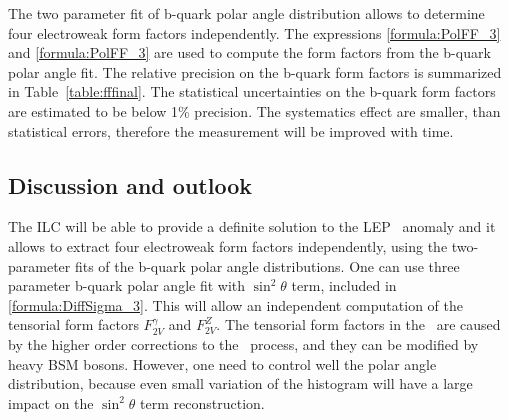 The two parameter fit of b-quark polar angle distribution allows to determine four electroweak form factors independently.
The expressions \ref{formula:PolFF_3} and \ref{formula:PolFF_3} are used to compute the form factors from the b-quark polar angle fit. 
The relative precision on the b-quark form factors is summarized in Table~\ref{table:fffinal}. 
The statistical uncertainties on the b-quark form factors are estimated to be below 1\% precision.
The systematics effect are smaller, than statistical errors, therefore the measurement will be improved with time. 






\subsection{Discussion and outlook}
The ILC will be able to provide a definite solution to the LEP \afbb\ anomaly and it allows to extract four electroweak form factors independently, using the two-parameter fits of the b-quark polar angle distributions. 
One can use three parameter b-quark polar angle fit with $\sin^2 \theta$ term, included in \ref{formula:DiffSigma_3}. 
This will allow an independent computation of the tensorial form factors $F^\gamma_{2V}$ and $F^Z_{2V}$.
The tensorial form factors in the \sm\ are caused by the higher order corrections to the \bbbar\ process, and they can be modified by heavy BSM bosons. 
However, one need to control well the polar angle distribution, because  even small variation of the histogram will have a large impact on the $\sin^2 \theta$ term reconstruction.

